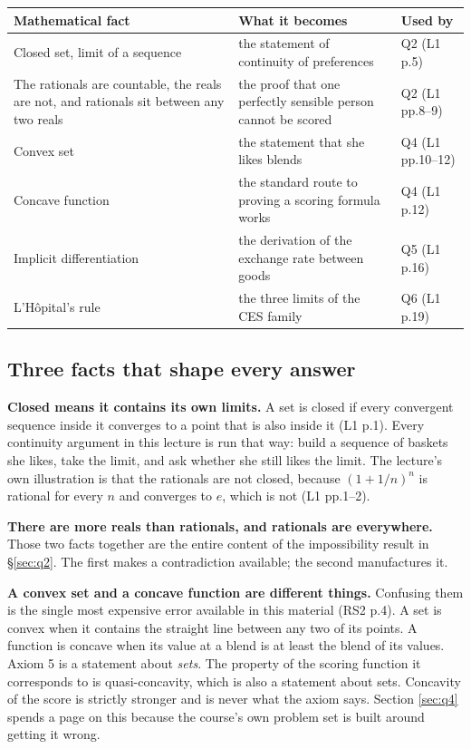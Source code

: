 \documentclass[11pt,letterpaper]{article}
\theoremstyle{definition}
\theoremstyle{plain}
\newcommand{\src}[1]{{\small\textsf{(#1)}}}
\begin{document}
\begin{center}
\begin{tabular}{@{}p{} p{} p{}@{}}
\toprule
\textbf{Mathematical fact} & \textbf{What it becomes} & \textbf{Used by} \\
\midrule
Closed set, limit of a sequence & the statement of continuity of preferences & Q2 \src{L1 p.5} \\
The rationals are countable, the reals are not, and rationals sit between any two reals & the proof that one perfectly sensible person cannot be scored & Q2 \src{L1 pp.8--9} \\
Convex set & the statement that she likes blends & Q4 \src{L1 pp.10--12} \\
Concave function & the standard route to proving a scoring formula works & Q4 \src{L1 p.12} \\
Implicit differentiation & the derivation of the exchange rate between goods & Q5 \src{L1 p.16} \\
L'H\^opital's rule & the three limits of the CES family & Q6 \src{L1 p.19} \\
\bottomrule
\end{tabular}
\end{center}

\subsection{Three facts that shape every answer}

\textbf{Closed means it contains its own limits.} A set is closed if every convergent sequence inside
it converges to a point that is also inside it \src{L1 p.1}. Every continuity argument in this
lecture is run that way: build a sequence of baskets she likes, take the limit, and ask whether she
still likes the limit. The lecture's own illustration is that the rationals are not closed, because
$(1 + 1/n)^n$ is rational for every $n$ and converges to $e$, which is not \src{L1 pp.1--2}.

\textbf{There are more reals than rationals, and rationals are everywhere.} Those two facts together
are the entire content of the impossibility result in \S\ref{sec:q2}. The first makes a contradiction
available; the second manufactures it.

\textbf{A convex set and a concave function are different things.} Confusing them is the single most
expensive error available in this material \src{RS2 p.4}. A set is convex when it contains the
straight line between any two of its points. A function is concave when its value at a blend is at
least the blend of its values. Axiom 5 is a statement about \emph{sets}. The property of the scoring
function it corresponds to is quasi-concavity, which is also a statement about sets. Concavity of the
score is strictly stronger and is never what the axiom says. Section \ref{sec:q4} spends a page on
this because the course's own problem set is built around getting it wrong.
\end{document}
